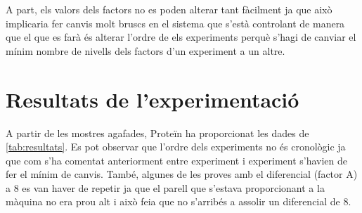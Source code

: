 \documentclass[a4paper]{article}
\begin{document}
A part, els valors dels factors no es poden alterar tant fàcilment ja que això implicaria fer canvis molt bruscs en el sistema que s'està controlant de manera que el que es farà és alterar l'ordre de els experiments perquè s'hagi de canviar el mínim nombre de nivells dels factors d'un experiment a un altre.

\section{Resultats de l'experimentació}
A partir de les mostres agafades, Proteïn ha proporcionat les dades de \autoref{tab:resultats}. Es pot observar que l'ordre dels experiments no és cronològic ja que com s'ha comentat anteriorment entre experiment i experiment s'havien de fer el mínim de canvis. També, algunes de les proves amb el diferencial (factor A) a 8 es van haver de repetir ja que el parell que s'estava proporcionant a la màquina no era prou alt i això feia que no s'arribés a assolir un diferencial de 8.
\end{document}
